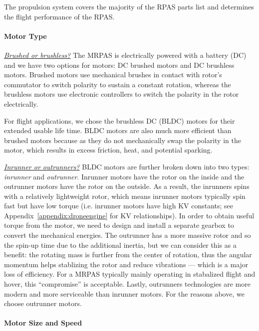 The propulsion system covers the majority of the RPAS parts list and determines the flight performance of the RPAS. 

\paragraph{Motor Type}

\underline{\textit{Brushed or brushless?}}
The MRPAS is electrically powered with a battery (DC) and we have two options for motors: DC brushed  motors and DC brushless motors. Brushed motors use mechanical brushes in contact with rotor’s commutator to switch polarity to sustain a constant rotation, whereas the brushless motors use electronic controllers to switch the polarity in the rotor electrically. 

For flight applications, we chose the brushless DC (BLDC) motors for their extended usable life time. BLDC motors are also much more efficient than brushed motors because as they do not mechanically swap the polarity in the motor, which results in excess friction, heat, and potential sparking. 

\underline{\textit{Inrunner or outrunners?}}
BLDC motors are further broken down into two types: \textit{inrunner} and \textit{outrunner}. Inrunner motors have the rotor on the inside and the outrunner motors have the rotor on the outside.  As a result, the inrunners spins with a relatively lightweight rotor, which means inrunner motors typically spin fast but have low torque (i.e. inrunner motors have high KV constants; see Appendix~\ref{appendix:droneengine} for KV relationships). In order to obtain useful torque from the motor, we need to design and install a separate gearbox to convert the mechanical energies\cite{invsoutrunner}. The outrunner has a more massive rotor and so the spin-up time due to the additional inertia, but we can consider this as a benefit: the rotating mass is further from the center of rotation, thus the angular momentum helps stablizing the rotor and reduce vibrations --- which is a major loss of efficiency. For a MRPAS typically mainly operating in stabalized flight and hover, this ``compromise'' is acceptable. Lastly, outrunners technologies are more modern and more serviceable than inrunner motors\cite{invsoutrunner}. For the reasons above, we choose outrunner motors.

\paragraph{Motor Size and Speed}\label{section:motor-speed}

